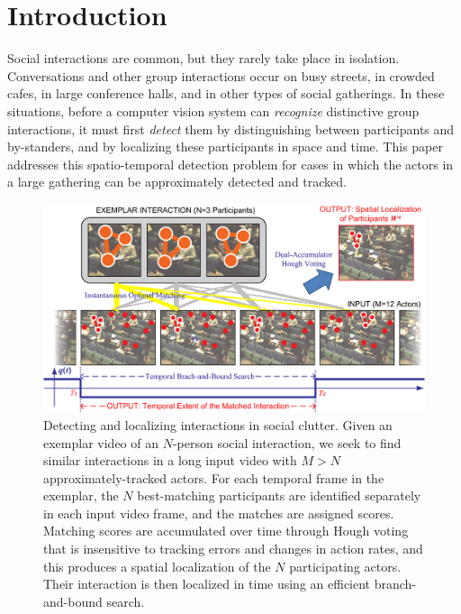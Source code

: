 \section{Introduction}

Social interactions are common, but they rarely take place in isolation. Conversations and other group interactions occur on busy streets, in crowded cafes, in large conference halls, and in other types of social gatherings. In these situations, before a computer vision system can \emph{recognize} distinctive group interactions, it must first \emph{detect} them by distinguishing between participants and by-standers, and by localizing these participants in space and time. This paper addresses this spatio-temporal detection problem for cases in which the actors in a large gathering can be approximately detected and tracked.

\begin{figure}[t]
\begin{center}
\includegraphics[width=\columnwidth]{diagram2.png}
\end{center}
\caption{Detecting and localizing interactions in social clutter. Given an exemplar video of an $N$-person social interaction, we seek to find similar interactions in a long input video with $M>N$ approximately-tracked actors. For each temporal frame in the exemplar, the $N$ best-matching participants are identified separately in each input video frame, and the matches are assigned scores. Matching scores are accumulated over time through Hough voting that is insensitive to tracking errors and changes in action rates, and this produces a spatial localization of the $N$ participating actors. Their interaction is then localized in time using an efficient branch-and-bound search.}
\label{diagram}
\end{figure}



